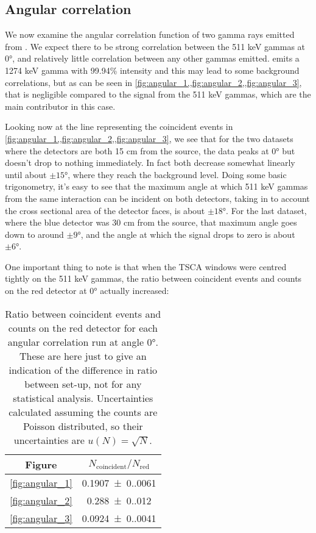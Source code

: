 \documentclass[11pt]{article}
\numberwithin{equation}{section}
\numberwithin{figure}{section}
\numberwithin{table}{section}
\begin{document}
\subsection{Angular correlation}
\par We now examine the angular correlation function of two gamma rays emitted from . We expect there to be strong correlation between the 511 keV gammas at $\ang{0}$, and relatively little correlation between any other gammas emitted.  emits a 1274 keV gamma with 99.94\% intensity \cite{22NaDecay} and this may lead to some background correlations, but as can be seen in \cref{fig:angular_1,,fig:angular_2,,fig:angular_3}, that is negligible compared to the signal from the 511 keV gammas, which are the main contributor in this case. 
\par Looking now at the line representing the coincident events in \cref{fig:angular_1,,fig:angular_2,,fig:angular_3}, we see that for the two datasets where the detectors are both 15 cm from the source, the data peaks at $\ang{0}$ but doesn't drop to nothing immediately. In fact both decrease somewhat linearly until about $\pm\ang{15}$, where they reach the background level. Doing some basic trigonometry, it's easy to see that the maximum angle at which 511 keV gammas from the same interaction can be incident on both detectors, taking in to account the cross sectional area of the detector faces, is about $\pm\ang{18}$. For the last dataset, where the blue detector was 30 cm from the source, that maximum angle goes down to around $\pm\ang{9}$, and the angle at which the signal drops to zero is about $\pm\ang{6}$. 
\par One important thing to note is that when the TSCA windows were centred tightly on the 511 keV gammas, the ratio between coincident events and counts on the red detector at $\ang{0}$ actually increased:

\begin{table}[H]
    \centering
    \begin{tabular}{c|c}
        Figure & $N_{\text{coincident}}/N_{\text{red}}$ \\\hline
        \ref{fig:angular_1} & \num{0.1907(0.0061)} \\
        \ref{fig:angular_2} & \num{0.288(0.012)} \\
        \ref{fig:angular_3} & \num{0.0924(0.0041)} \\
    \end{tabular}
    \caption{Ratio between coincident events and counts on the red detector for each angular correlation run at angle $\ang{0}$. These are here just to give an indication of the difference in ratio between set-up, not for any statistical analysis. Uncertainties calculated assuming the counts are Poisson distributed, so their uncertainties are $u(N)=\sqrt{N}$.}
    \label{tbl:angular ratio}
\end{table}
\end{document}
